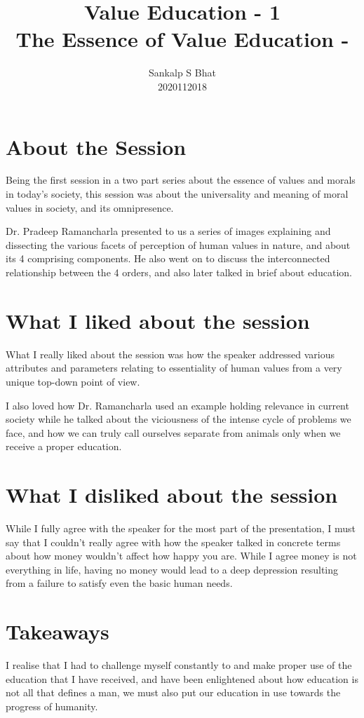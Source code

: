 \documentclass[a4paper, 12pt]{extarticle}
\title{Value Education - 1\\
The Essence of Value Education - \uppercase\expandafter{\romannumeral1\relax}}
\author{Sankalp S Bhat\\
2020112018
}
\begin{document}
\maketitle
\thispagestyle{empty}

\section*{About the Session}

Being the first session in a two part series about the essence of values and morals in today's society, this session was about the universality and meaning of moral values in society, and its omnipresence.

Dr. Pradeep Ramancharla presented to us a series of images explaining and dissecting the various facets of perception of human values in nature, and about its 4 comprising components. He also went on to discuss the interconnected relationship between the 4 orders, and also later talked in brief about education.
      
\section*{What I liked about the session}

What I really liked about the session was how the speaker addressed various attributes and parameters relating to essentiality of human values from a very unique top-down point of view.
    
I also loved how Dr. Ramancharla used an example holding relevance in current society while he talked about the viciousness of the intense cycle of problems we face, and how we can truly call ourselves separate from animals only when we receive a proper education.

\section*{What I disliked about the session}
 
While I fully agree with the speaker for the most part of the presentation, I must say that I couldn't really agree with how the speaker talked in concrete terms about how money wouldn't affect how happy you are. While I agree money is not everything in life, having no money would lead to a deep depression resulting from a failure to satisfy even the basic human needs.

\section*{Takeaways}
    
I realise that I had to challenge myself constantly to and make proper use of the education that I have received, and have been enlightened about how education is not all that defines a man, we must also put our education in use towards the progress of humanity.
\end{document}
